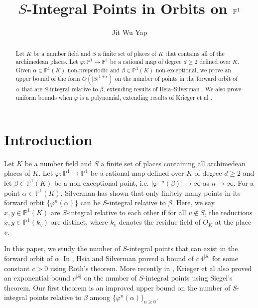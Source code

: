 \documentclass[10pt, reqno]{amsart}
\title{$S$-Integral Points in Orbits on $\bb{P}^1$}
\newcommand{\bb}{\mathbb}
\newcommand{\vphi}{\varphi}
\newcommand{\ovl}{\overline}
\numberwithin{theorem}{section}
\numberwithin{equation}{section}
\numberwithin{example}{section}
\numberwithin{definition}{section}
\begin{document}
\author{Jit Wu Yap}


\begin{abstract}
Let $K$ be a number field and $S$ a finite set of places of $K$ that contains  all of the archimedean places. Let $\vphi: \bb{P}^1 \to \bb{P}^1$ be a rational map of degree $d \geq 2$ defined over $K$. Given $\alpha \in \bb{P}^1(K)$ non-preperiodic and $\beta \in \bb{P}^1(K)$ non-exceptional, we prove an upper bound of the form $O(|S|^{1+\epsilon})$ on the number of points in the forward orbit of $\alpha$ that are $S$-integral relative to $\beta$, extending results of Hsia--Silverman \cite{HS11}. We also prove uniform bounds when $\vphi$ is a polynomial, extending results of Krieger et al \cite{KLS15}.     
\end{abstract}

\maketitle

\tableofcontents

\section{Introduction}
Let $K$ be a number field and $S$ a finite set of places containing all archimedean places of $K$. Let $\vphi: \bb{P}^1 \to \bb{P}^1$ be a rational map defined over $K$ of degree $d \geq 2$ and let $\beta \in \bb{P}^1(K)$ be a non-exceptional point, i.e. $|\vphi^{-n}(\beta)| \to \infty$ as $n \to \infty$. For a point $\alpha \in \bb{P}^1(K)$, Silverman \cite{Sil93} has shown that only finitely many points in its forward orbit $\{\vphi^n(\alpha)\}$ can be $S$-integral relative to $\beta$. Here, we say $x,y \in \bb{P}^1(K)$ are $S$-integral relative to each other if for all $v \not \in S$, the reductions $\ovl{x},\ovl{y} \in \bb{P}^1(k_v)$ are distinct, where $k_v$ denotes the residue field of $O_K$ at the place $v$.
\par 
In this paper, we study the number of $S$-integral points that can exist in the forward orbit of $\alpha$. In \cite{HS11}, Hsia and Silverman proved a bound of $c \, 4^{|S|}$ for some constant $c > 0$ using Roth's theorem. More recently in \cite{KLS15}, Krieger et al also proved an exponential bound $c^{|S|}$ on the number of $S$-integral points using Siegel's theorem. Our first theorem is an improved upper bound on the number of $S$-integral points relative to $\beta$ among $\{\vphi^n(\alpha)\}_{n \geq 0}$. 
\end{document}
